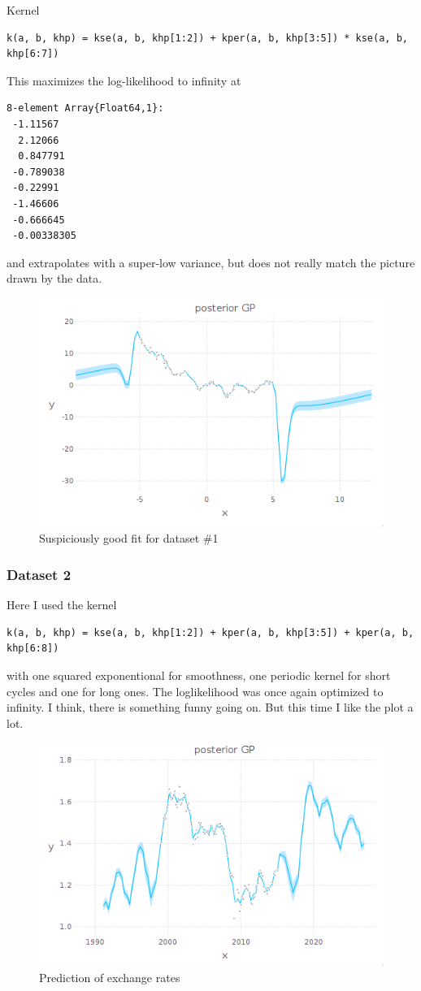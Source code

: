 \documentclass[10pt,a4paper]{article}
\begin{document}
Kernel
\begin{verbatim}
k(a, b, khp) = kse(a, b, khp[1:2]) + kper(a, b, khp[3:5]) * kse(a, b, khp[6:7])
\end{verbatim}
This maximizes the log-likelihood to infinity at
\begin{verbatim}
8-element Array{Float64,1}:
 -1.11567
  2.12066
  0.847791
 -0.789038
 -0.22991
 -1.46606
 -0.666645
 -0.00338305
\end{verbatim}
and extrapolates with a super-low variance, but does not really match the
picture drawn by the data.
\begin{figure}[h]
  \centering
  \includegraphics[width=350pt]{1_b_1}
  \caption{Suspiciously good fit for dataset \#1}
\end{figure}

\subsubsection{Dataset 2}

Here I used the kernel
\begin{verbatim}
k(a, b, khp) = kse(a, b, khp[1:2]) + kper(a, b, khp[3:5]) + kper(a, b, khp[6:8])
\end{verbatim}
with one squared exponentional for smoothness, one periodic kernel for short
cycles and one for long ones. The loglikelihood was once again optimized to
infinity. I think, there is something funny going on. But this time I like the
plot a lot.
\begin{figure}[h]
  \centering
  \includegraphics[width=350pt]{1_b_2}
  \caption{Prediction of exchange rates}
\end{figure}
\end{document}
